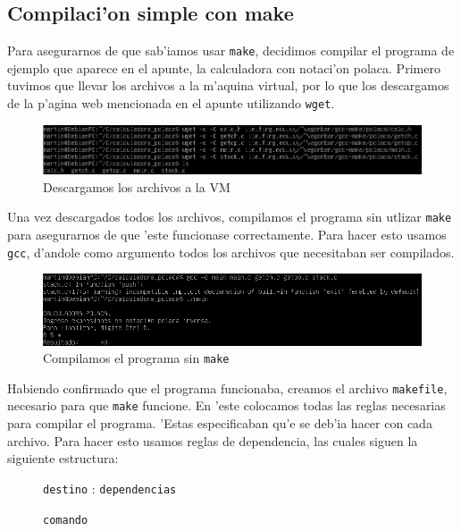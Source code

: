 \documentclass[11pt]{article}
\newcommand{\codetext}[2]{\large\texttt{\textcolor{#1}{#2}}}
\begin{document}

	\subsection{Compilaci'on simple con make}
		Para asegurarnos de que sab'iamos usar \texttt{make}, decidimos compilar el programa de ejemplo que aparece en el apunte, la calculadora con notaci'on polaca. Primero tuvimos que llevar los archivos a la m'aquina virtual, por lo que los descargamos de la p'agina web mencionada en el apunte utilizando \texttt{wget}.
		
		\begin{figure}[H]
				\centering
				\includegraphics[width=.9\linewidth]{Images/Seccion 2/S2.PNG}
				\caption{Descargamos los archivos a la VM}
				\label{fig:makefile-download}
		\end{figure}
		
		Una vez descargados todos los archivos, compilamos el programa sin utlizar \texttt{make} para asegurarnos de que 'este funcionase correctamente. Para hacer esto usamos \texttt{gcc}, d'andole como argumento todos los archivos que necesitaban ser compilados.
		
		\begin{figure}[H]
				\centering
				\includegraphics[width=.9\linewidth]{Images/Seccion 2/S2 parte dos.PNG}
				\caption{Compilamos el programa sin \texttt{make}}
				\label{fig:makefile-gcc-compile}
		\end{figure}
	
		Habiendo confirmado que el programa funcionaba, creamos el archivo \texttt{makefile}, necesario para que \texttt{make} funcione. En 'este colocamos todas las reglas necesarias para compilar el programa. 'Estas especificaban qu'e se deb'ia hacer con cada archivo. Para hacer esto usamos reglas de dependencia, las cuales siguen la siguiente estructura:
		
		\begin{figure}[H]
			\centering
			\begin{code-box}
				{\large
					\codetext{light-blue}{destino} : \codetext{orange-desert-vim}{dependencias} \vspace{-2pt}
					
					\quad\codetext{light-red}{comando}
				}
			\end{code-box}
		\end{figure} \vspace{-12pt}
		
\end{document}
